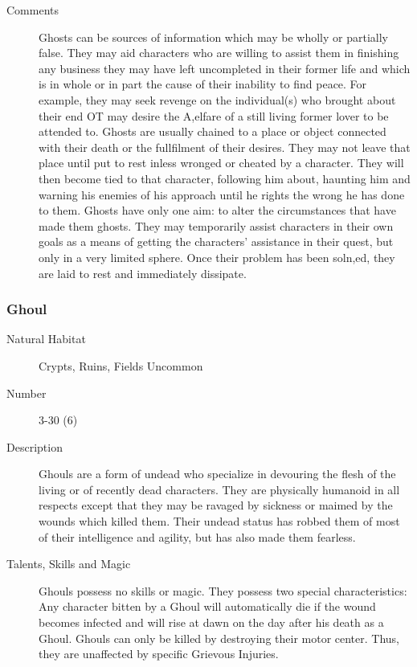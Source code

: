 \begin{multicols*}{2}
\begin{description}
\item[Comments] Ghosts can be sources of information which may be wholly or
partially false. They may aid characters who are willing to assist
them in finishing any business they may have left uncompleted in their
former life and which is in whole or in part the cause of their
inability to find peace. For example, they may seek revenge on the
individual(s) who brought about their end OT may desire the A,elfare
of a still living former lover to be attended to. Ghosts are usually
chained to a place or object connected with their death or the
fullfilment of their desires.  They may not leave that place until put
to rest inless wronged or cheated by a character. They will then
become tied to that character, following him about, haunting him and
warning his enemies of his approach until he rights the wrong he has
done to them. Ghosts have only one aim: to alter the circumstances
that have made them ghosts. They may temporarily assist characters in
their own goals as a means of getting the characters' assistance in
their quest, but only in a very limited sphere. Once their problem has
been soln,ed, they are laid to rest and immediately dissipate.

\end{description}

\subsubsection{Ghoul}

\begin{description}
\item[Natural Habitat] Crypts, Ruins, Fields Uncommon

\item[Number]   3-30 (6)

\item[Description] Ghouls are a form of undead who specialize in devouring
the flesh of the living or of recently dead characters.  They are
physically humanoid in all respects except that they may be ravaged by
sickness or maimed by the wounds which killed them. Their undead
status has robbed them of most of their intelligence and agility, but
has also made them fearless.

\item[Talents, Skills and Magic] Ghouls possess no skills or magic.  They possess two special
characteristics: Any character bitten by a Ghoul will automatically
die if the wound becomes infected and will rise at dawn on the day
after his death as a Ghoul.  Ghouls can only be killed by destroying
their motor center.  Thus, they are unaffected by specific Grievous
Injuries.


\end{description}
\end{multicols*}
